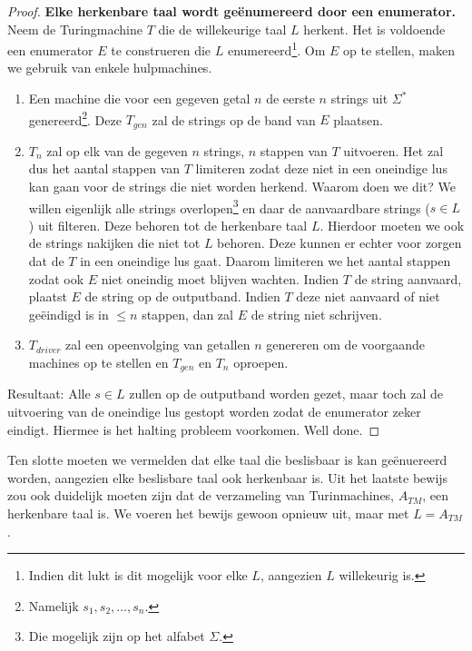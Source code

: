 \begin{proof}
	\textbf{Elke herkenbare taal wordt ge\"enumereerd door een enumerator.} Neem de Turingmachine $T$ die de willekeurige taal $L$ herkent. Het is voldoende een enumerator $E$ te construeren die $L$ enumereerd\footnote{Indien dit lukt is dit mogelijk voor elke $L$, aangezien $L$ willekeurig is.}. Om $E$ op te stellen, maken we gebruik van enkele hulpmachines.\\
	\begin{enumerate}
		\item Een machine die voor een gegeven getal $n$ de eerste $n$ strings uit $\Sigma^*$ genereerd\footnote{Namelijk $s_1,s_2, \dots ,s_n$.}. Deze $T_{gen}$ zal de strings op de band van $E$ plaatsen.
		\item $T_n$  zal op elk van de gegeven $n$ strings, $n$ stappen van $T$ uitvoeren. Het zal dus het aantal stappen van $T$ limiteren zodat deze niet in een oneindige lus kan gaan voor de strings die niet worden herkend. Waarom doen we dit? We willen eigenlijk alle strings overlopen\footnote{Die mogelijk zijn op het alfabet $\Sigma$.} en daar de aanvaardbare strings ($s \in L$) uit filteren. Deze behoren tot de herkenbare taal $L$. Hierdoor moeten we ook de strings nakijken die niet tot $L$ behoren. Deze kunnen er echter voor zorgen dat de $T$ in een oneindige lus gaat. Daarom limiteren we het aantal stappen zodat ook $E$ niet oneindig moet blijven wachten. Indien $T$ de string aanvaard, plaatst $E$ de string op de outputband. Indien $T$ deze niet aanvaard of niet ge\"eindigd is in $\leq n$ stappen, dan zal $E$ de string niet schrijven.
		\item $T_{driver}$ zal een opeenvolging van getallen $n$ genereren om de voorgaande machines op te stellen en $T_{gen}$ en $T_n$ oproepen.\\
	\end{enumerate}
	Resultaat: Alle $s \in L$ zullen op de outputband worden gezet, maar toch zal de uitvoering van de oneindige lus gestopt worden zodat de enumerator zeker eindigt. Hiermee is het halting probleem voorkomen. Well done.
\end{proof}

Ten slotte moeten we vermelden dat elke taal die beslisbaar is kan ge\"enuereerd worden, aangezien elke beslisbare taal ook herkenbaar is. Uit het laatste bewijs zou ook duidelijk moeten zijn dat de verzameling van Turinmachines, $A_{TM}$, een herkenbare taal is. We voeren het bewijs gewoon opnieuw uit, maar met $L = A_{TM}$.